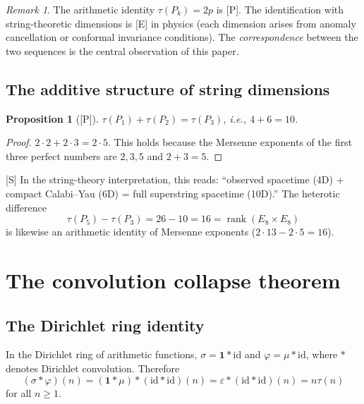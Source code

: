 \documentclass[11pt,letterpaper]{article}
\newtheorem{proposition}[theorem]{Proposition}
\theoremstyle{definition}
\theoremstyle{remark}
\newtheorem*{remark}{Remark}
\newcommand{\proven}{\textsf{[P]}}
\newcommand{\established}{\textsf{[E]}}
\newcommand{\speculative}{\textsf{[S]}}
\begin{document}
\begin{remark}
The arithmetic identity $\tau(P_k) = 2p$ is \proven. The identification with 
string-theoretic dimensions is \established{} in physics (each dimension 
arises from anomaly cancellation or conformal invariance conditions).  
The \emph{correspondence} between the two sequences is the central 
observation of this paper.
\end{remark}

\subsection{The additive structure of string dimensions}

\begin{proposition}[\proven]\label{prop:dim-add}
$\tau(P_1) + \tau(P_2) = \tau(P_3)$, i.e., $4 + 6 = 10$.
\end{proposition}

\begin{proof}
$2 \cdot 2 + 2 \cdot 3 = 2 \cdot 5$. This holds because the Mersenne 
exponents of the first three perfect numbers are $2, 3, 5$ and $2+3=5$.
\end{proof}

\speculative{} In the string-theory interpretation, this reads: 
``observed spacetime (4D) + compact Calabi--Yau (6D) = full superstring 
spacetime (10D).'' The heterotic difference
\begin{equation}
\tau(P_5) - \tau(P_3) = 26 - 10 = 16 = \operatorname{rank}(E_8 \times E_8)
\end{equation}
is likewise an arithmetic identity of Mersenne exponents ($2 \cdot 13 - 2\cdot 5 = 16$).

\section{The convolution collapse theorem}
\label{sec:conv-collapse}

\subsection{The Dirichlet ring identity}

In the Dirichlet ring of arithmetic functions, $\sigma = \mathbf{1} * \mathrm{id}$ 
and $\varphi = \mu * \mathrm{id}$, where $*$ denotes Dirichlet convolution.  
Therefore
\begin{equation}\label{eq:ring-id}
(\sigma * \varphi)(n) = (\mathbf{1} * \mu) * (\mathrm{id} * \mathrm{id})(n) 
= \varepsilon * (\mathrm{id} * \mathrm{id})(n) = n\tau(n)
\end{equation}
for all $n \geq 1$.
\end{document}
